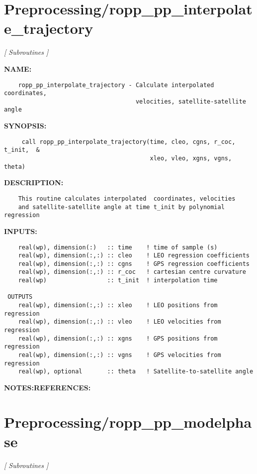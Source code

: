 \section{Preprocessing/ropp\_pp\_interpolate\_trajectory}
\textsl{[ Subroutines ]}

\label{ch:robo76}
\label{ch:Preprocessing_ropp_pp_interpolate_trajectory}
\textbf{NAME:}\hspace{0.08in}\begin{Verbatim}
    ropp_pp_interpolate_trajectory - Calculate interpolated coordinates,
                                     velocities, satellite-satellite angle
\end{Verbatim}
\textbf{SYNOPSIS:}\hspace{0.08in}\begin{Verbatim}
     call ropp_pp_interpolate_trajectory(time, cleo, cgns, r_coc, t_init,  & 
                                         xleo, vleo, xgns, vgns, theta)
\end{Verbatim}
\textbf{DESCRIPTION:}\hspace{0.08in}\begin{Verbatim}
    This routine calculates interpolated  coordinates, velocities
    and satellite-satellite angle at time t_init by polynomial regression
\end{Verbatim}
\textbf{INPUTS:}\hspace{0.08in}\begin{Verbatim}
    real(wp), dimension(:)   :: time    ! time of sample (s)
    real(wp), dimension(:,:) :: cleo    ! LEO regression coefficients
    real(wp), dimension(:,:) :: cgns    ! GPS regression coefficients
    real(wp), dimension(:,:) :: r_coc   ! cartesian centre curvature
    real(wp)                 :: t_init  ! interpolation time

 OUTPUTS
    real(wp), dimension(:,:) :: xleo    ! LEO positions from regression
    real(wp), dimension(:,:) :: vleo    ! LEO velocities from regression
    real(wp), dimension(:,:) :: xgns    ! GPS positions from regression
    real(wp), dimension(:,:) :: vgns    ! GPS velocities from regression
    real(wp), optional       :: theta   ! Satellite-to-satellite angle
\end{Verbatim}
\textbf{NOTES:}\hspace{0.08in}\textbf{REFERENCES:}\hspace{0.08in}\section{Preprocessing/ropp\_pp\_modelphase}
\textsl{[ Subroutines ]}

